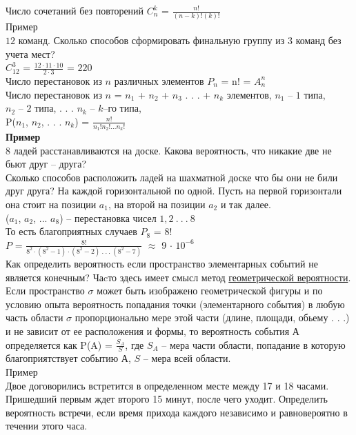 \documentclass[russian, 12pt, fleqn]{article}
\begin{document}
Число сочетаний без повторений  $C^k_n$ = $\frac{n!}{(n-k)!(k)!}$\\
$\textbf{Пример}$ \\$12$ команд. Сколько способов сформировать финальную группу из $3$ команд без учета мест?\\
  $C^3_{12}$  = $\frac{ 12\cdot11\cdot 10 }{2\cdot3} $ = $220$\\
Число  перестановок из $n$ различных элементов $P_n$ = n! = ${A^n_n}$\\
Число перестановок из $n$ = $n_1$ + $n_2$ +  $n_3$ . . .  + $n_k$ элементов, $n_1$ -- $1$ типа,\\ $n_2$ -- $2$ типа, . . . $n_k$ -- $k$--го типа,\\
P($n_1$,  $n_2$, . . .  $n_k$) = $\frac{n!}{{n_1}!{n_2}!. . .{n_k}!}$\\
\textbf{Пример}\\ 8 ладей расстанавливаются на доске. Какова вероятность, что никакие две не бьют друг -- друга?\\
Сколько способов расположить ладей на шахматной доске что бы они не били друг друга? На каждой горизонтальной по одной. Пусть  на первой горизонтали она стоит на позиции $a_1$,  на второй на позиции $a_2$ и так далее.\\
($a_1$, $a_2$, ... $a_8$)  -- перестановка чисел $1,2\ .\ .\ .\ $8\\
То есть благоприятных случаев $P_8$ = $8$!\\
$P$ = $\frac{8!}{ 8^2 \cdot (8^2 - 1) \cdot (8^2 - 2)  \ .\ .\ . \   (8^2 - 7)} $  $\approx$   9 $\cdot$  $10^{-6}$\\
Как определить вероятность если пространство элементарных событий не является конечным? Чаcто здесь имеет смысл метод \underline{геометрической вероятности}. Если пространство  $\sigma$ может быть изображено геометрической фигуры и по условию опыта вероятность попадания точки (элементарного события) в любую часть области $\sigma$ пропорционально мере этой части (длине, площади, обьему . . .) и не зависит от ее расположения и формы, то вероятность события А определяется как P(A) = $\frac{S_A}{S}$, где $S_A$ -- мера части области, попадание в которую благоприятствует событию $А$, $S$ -- мера всей области.\\
$\textbf{Пример}$\\Двое договорились встретится в определенном месте между 17 и 18 часами. Пришедший первым ждет второго 15 минут, после чего уходит. Определить вероятность встречи, если время прихода каждого независимо и равновероятно в течении этого часа.\\
\end{document}
